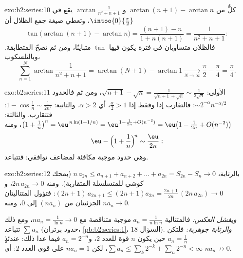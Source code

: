 \begin{solution}{exo:b2:series:10}
كلٌّ من $\arctan(n+1) - \arctan n$ و
$\arctan\frac{1}{n^2+n+1}$ يقع في $\intoo{0}{\frac\pi2}$، وتعطي
صيغة جمع الظلال أن
\[
\tan\bigl(\arctan(n{+}1) - \arctan n\bigr)
= \frac{(n+1) - n}{1 + n(n+1)} = \frac{1}{n^2 + n + 1} :
\]
فالظلان متساويان في فترة يكون فيها $\tan$ متباينًا، ومن ثم تصحّ
المتطابقة. وبالتلسكوب،
\[
\sum_{n=1}^{N}\arctan\frac{1}{n^2+n+1}
= \arctan(N{+}1) - \arctan 1 \xrightarrow[N\to\infty]{}
\frac\pi2 - \frac\pi4 = \frac\pi4 .
\]

\end{solution}

\begin{solution}{exo:b2:series:11}
الأولى: $\sqrt{n+1} - \sqrt n = \frac{1}{\sqrt{n+1} + \sqrt n}
\sim \frac{1}{2\sqrt n}$، ومن ثم فالحدود $\sim
2^{-\alpha}n^{-\alpha/2}$: فالتقارب إذا وفقط إذا $\frac\alpha2 > 1$،
أي $\alpha > 2$. والثانية: $1 - \cos\frac1n \sim
\frac{1}{2n^2}$: فتتقارب. والثالثة: $\bigl(1 + \frac1n\bigr)^n =
\eu^{\,n\ln(1 + 1/n)} = \eu^{\,1 - \frac1{2n} + O(n^{-2})} =
\eu\bigl(1 - \frac{1}{2n} + O(n^{-2})\bigr)$، ومنه
\[
\eu - \Bigl(1 + \frac1n\Bigr)^{\!n} \sim \frac{\eu}{2n} :
\]
وهي حدود موجبة مكافئة لمضاعف توافقي: فتتباعد.
\end{solution}

\begin{solution}{exo:b2:series:12}
بالرتابة، $n\,a_{2n} \leq a_{n+1} + a_{n+2} + \dots +
a_{2n} = S_{2n} - S_n \to 0$ (بمحك كوشي للمتسلسلة
المتقاربة). ومنه $2n\,a_{2n} \to 0$، و$(2n{+}1)\,
a_{2n+1} \leq (2n{+}1)a_{2n} = \frac{2n+1}{2n}\,(2n\,a_{2n}) \to
0$: فتؤول المتتاليتان الجزئيتان من $(na_n)$ إلى $0$، ومنه $na_n \to 0$.

\emph{ويفشل العكس:} فالمتتالية $a_n = \frac1{n\ln n}$ موجبة
متناقصة مع $na_n = \frac1{\ln n} \to 0$، ومع ذلك تتباعد $\sum a_n$
(حدود برتران، \cref{pb:b2:series:1}، السؤال
18). \emph{والرتابة جوهرية:} فلتكن $a_n = \frac1n$ حين يكون $n$
قوة للعدد $2$، و$a_n = 2^{-n}$ فيما عدا ذلك: عندئذٍ $\sum a_n \leq
\sum_k 2^{-k} + \sum_n 2^{-n} < \infty$، لكن $na_n = 1$ على
قوى العدد $2$: أي $na_n \not\to 0$.
\end{solution}

